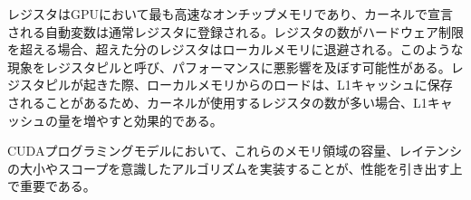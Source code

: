 \documentclass[a4paper,11pt,oneside,openany]{jsbook}
\begin{document}
レジスタはGPUにおいて最も高速なオンチップメモリであり、カーネルで宣言される自動変数は通常レジスタに登録される。レジスタの数がハードウェア制限を超える場合、超えた分のレジスタはローカルメモリに退避される。このような現象をレジスタピルと呼び、パフォーマンスに悪影響を及ぼす可能性がある。レジスタピルが起きた際、ローカルメモリからのロードは、L1キャッシュに保存されることがあるため、カーネルが使用するレジスタの数が多い場合、L1キャッシュの量を増やすと効果的である。

CUDAプログラミングモデルにおいて、これらのメモリ領域の容量、レイテンシの大小やスコープを意識したアルゴリズムを実装することが、性能を引き出す上で重要である。




\end{document}
